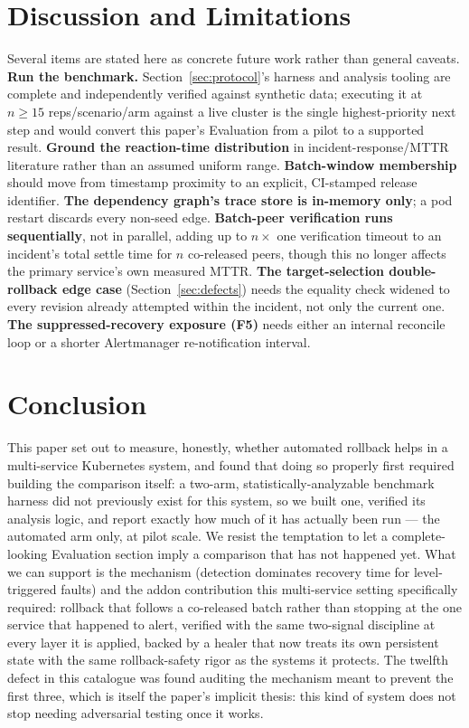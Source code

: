 \documentclass[conference]{IEEEtran}
\begin{document}
\section{Discussion and Limitations}
\label{sec:discussion}
Several items are stated here as concrete future work rather than general caveats. \textbf{Run the benchmark.} Section~\ref{sec:protocol}'s harness and analysis tooling are complete and independently verified against synthetic data; executing it at $n \geq 15$ reps/scenario/arm against a live cluster is the single highest-priority next step and would convert this paper's Evaluation from a pilot to a supported result. \textbf{Ground the reaction-time distribution} in incident-response/MTTR literature rather than an assumed uniform range. \textbf{Batch-window membership} should move from timestamp proximity to an explicit, CI-stamped release identifier. \textbf{The dependency graph's trace store is in-memory only}; a pod restart discards every non-seed edge. \textbf{Batch-peer verification runs sequentially}, not in parallel, adding up to $n \times$ one verification timeout to an incident's total settle time for $n$ co-released peers, though this no longer affects the primary service's own measured MTTR. \textbf{The target-selection double-rollback edge case} (Section~\ref{sec:defects}) needs the equality check widened to every revision already attempted within the incident, not only the current one. \textbf{The suppressed-recovery exposure (F5)} needs either an internal reconcile loop or a shorter Alertmanager re-notification interval.

\section{Conclusion}
This paper set out to measure, honestly, whether automated rollback helps in a multi-service Kubernetes system, and found that doing so properly first required building the comparison itself: a two-arm, statistically-analyzable benchmark harness did not previously exist for this system, so we built one, verified its analysis logic, and report exactly how much of it has actually been run --- the automated arm only, at pilot scale. We resist the temptation to let a complete-looking Evaluation section imply a comparison that has not happened yet. What we can support is the mechanism (detection dominates recovery time for level-triggered faults) and the addon contribution this multi-service setting specifically required: rollback that follows a co-released batch rather than stopping at the one service that happened to alert, verified with the same two-signal discipline at every layer it is applied, backed by a healer that now treats its own persistent state with the same rollback-safety rigor as the systems it protects. The twelfth defect in this catalogue was found auditing the mechanism meant to prevent the first three, which is itself the paper's implicit thesis: this kind of system does not stop needing adversarial testing once it works.
\end{document}
